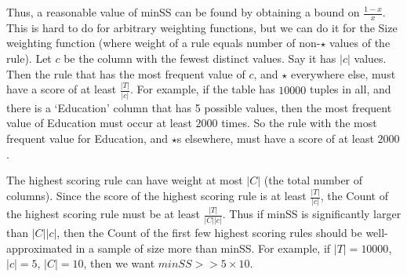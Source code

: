 \documentclass[10pt,journal,compsoc]{IEEEtran}
\begin{document}
{Thus, a reasonable value of minSS can be found by obtaining a bound on $\frac{1-x}{x}$. This is hard to do for arbitrary weighting functions, but we can do it for the Size weighting function (where weight of a rule equals number of non-$\star$ values of the rule). Let $c$ be the column with the fewest distinct values. Say it has $|c|$ values. Then the rule that has the most frequent value of $c$, and $\star$ everywhere else, must have a score of at least $\frac{|T|}{|c|}$. For example, if the table has $10000$ tuples in all, and there is a `Education' column that has 5 possible values, then the most frequent value of Education must occur at least $2000$ times. So the rule with the most frequent value for Education, and $\star$s elsewhere, must have a score of at least $2000$. 

The highest scoring rule can have weight at most $|C|$ (the total number of columns). Since the score of the highest scoring rule is at least $\frac{|T|}{|c|}$, the Count of the highest scoring rule must be at least $\frac{|T|}{|C||c|}$. Thus if minSS is significantly larger than $|C||c|$, then the Count of the first few highest scoring rules should be well-approximated in a sample of size more than minSS. For example, if $|T| = 10000$, $|c| = 5$, $|C| = 10$, then we want $minSS >> 5 \times 10$.
}
\end{document}
